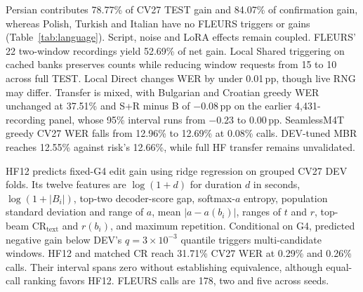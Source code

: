 Persian contributes 78.77\% of CV27 TEST gain and 84.07\% of confirmation gain, whereas Polish, Turkish and Italian have no FLEURS triggers or gains (Table~\ref{tab:language}). Script, noise and LoRA effects remain coupled. FLEURS' 22 two-window recordings yield 52.69\% of net gain. Local Shared triggering on cached banks preserves counts while reducing window requests from 15 to 10 across full TEST. Local Direct changes WER by under 0.01\,pp, though live RNG may differ. Transfer is mixed, with Bulgarian and Croatian greedy WER unchanged at 37.51\% and S+R minus B of $-0.08$\,pp on the earlier 4,431-recording panel, whose 95\% interval runs from $-0.23$ to $0.00$\,pp. SeamlessM4T~\cite{seamless2023,seamlessv1nature} greedy CV27 WER falls from 12.96\% to 12.69\% at 0.08\% calls. DEV-tuned MBR reaches 12.55\% against risk's 12.66\%, while full HF transfer remains unvalidated.

HF12 predicts fixed-G4 edit gain using ridge regression on grouped CV27 DEV folds. Its twelve features are $\log(1+d)$ for duration $d$ in seconds, $\log(1+|B_i|)$, top-two decoder-score gap, softmax-$a$ entropy, population standard deviation and range of $a$, mean $|a-a(b_i)|$, ranges of $t$ and $r$, top-beam $\mathrm{CR}_{\mathrm{text}}$ and $r(b_i)$, and maximum repetition. Conditional on G4, predicted negative gain below DEV's $q=3\times10^{-3}$ quantile triggers multi-candidate windows. HF12 and matched CR reach 31.71\% CV27 WER at 0.29\% and 0.26\% calls. Their interval spans zero without establishing equivalence, although equal-call ranking favors HF12. FLEURS calls are 178, two and five across seeds.

